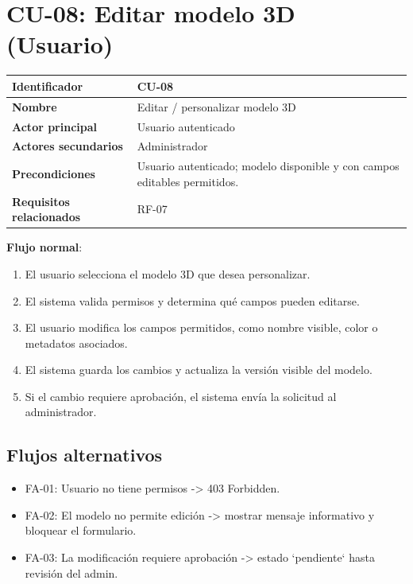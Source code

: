 \documentclass[12pt,a4paper]{article}
\begin{document}
\section{CU-08: Editar modelo 3D (Usuario)}
\begin{tabular}{|p{3.5cm}|p{10cm}|}
\hline
\textbf{Identificador} & CU-08 \\
\hline
\textbf{Nombre} & Editar / personalizar modelo 3D \\
\hline
\textbf{Actor principal} & Usuario autenticado \\
\hline
\textbf{Actores secundarios} & Administrador \\
\hline
\textbf{Precondiciones} & Usuario autenticado; modelo disponible y con campos editables permitidos. \\
\hline
\textbf{Requisitos relacionados} & RF-07 \\
\hline
\end{tabular}

\vspace{0.5em}
\textbf{Flujo normal}:
\begin{enumerate}[leftmargin=*]
    \item El usuario selecciona el modelo 3D que desea personalizar.
    \item El sistema valida permisos y determina qu\'e campos pueden editarse.
    \item El usuario modifica los campos permitidos, como nombre visible, color o metadatos asociados.
    \item El sistema guarda los cambios y actualiza la versi\'on visible del modelo.
    \item Si el cambio requiere aprobaci\'on, el sistema env\'ia la solicitud al administrador.
\end{enumerate}

\subsection*{Flujos alternativos}
\begin{itemize}[leftmargin=*]
    \item FA-01: Usuario no tiene permisos -> 403 Forbidden.
    \item FA-02: El modelo no permite edici\'on -> mostrar mensaje informativo y bloquear el formulario.
    \item FA-03: La modificaci\'on requiere aprobaci\'on -> estado `pendiente` hasta revisi\'on del admin.
\end{itemize}
\end{document}
